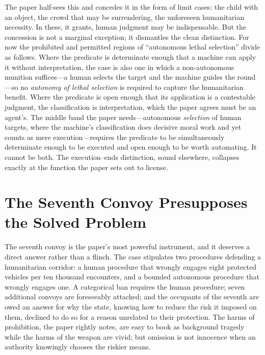 \documentclass[11pt]{article}
\begin{document}
The paper half-sees this and concedes it in the form of limit cases: the child with an object, the crowd that may be surrendering, the unforeseen humanitarian necessity. In these, it grants, human judgment may be indispensable. But the concession is not a marginal exception; it dismantles the clean distinction. For now the prohibited and permitted regions of ``autonomous lethal selection'' divide as follows. Where the predicate is determinate enough that a machine can apply it without interpretation, the case is also one in which a non-autonomous munition suffices---a human selects the target and the machine guides the round---so no \emph{autonomy of lethal selection} is required to capture the humanitarian benefit. Where the predicate is open enough that its application is a contestable judgment, the classification is interpretation, which the paper agrees must be an agent's. The middle band the paper needs---autonomous \emph{selection} of human targets, where the machine's classification does decisive moral work and yet counts as mere execution---requires the predicate to be simultaneously determinate enough to be executed and open enough to be worth automating. It cannot be both. The execution--ends distinction, sound elsewhere, collapses exactly at the function the paper sets out to license.

\section{The Seventh Convoy Presupposes the Solved Problem}
\label{sec:convoy}

The seventh convoy is the paper's most powerful instrument, and it deserves a direct answer rather than a flinch. The case stipulates two procedures defending a humanitarian corridor: a human procedure that wrongly engages eight protected vehicles per ten thousand encounters, and a bounded autonomous procedure that wrongly engages one. A categorical ban requires the human procedure; seven additional convoys are foreseeably attacked; and the occupants of the seventh are owed an answer for why the state, knowing how to reduce the risk it imposed on them, declined to do so for a reason unrelated to their protection. The harms of prohibition, the paper rightly notes, are easy to book as background tragedy while the harms of the weapon are vivid; but omission is not innocence when an authority knowingly chooses the riskier means.
\end{document}
